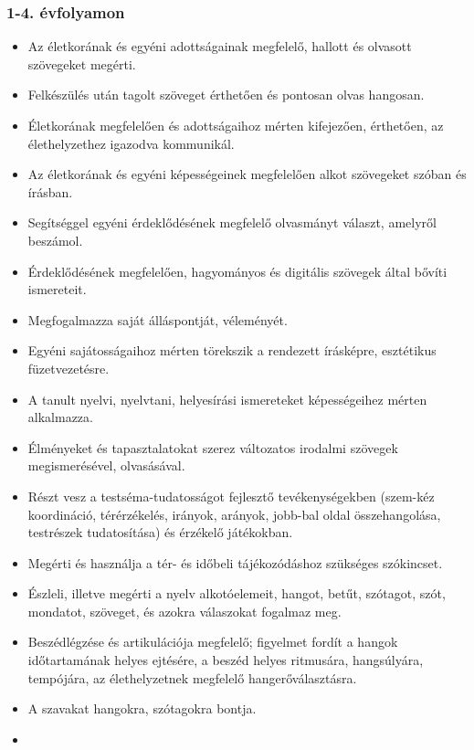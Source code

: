 \hypertarget{evfolyamon-21}{%
\subsubsection{1-4. évfolyamon}\label{evfolyamon-21}}

\begin{itemize}
\item
  Az életkorának és egyéni adottságainak megfelelő, hallott és olvasott
  szövegeket megérti.
\item
  Felkészülés után tagolt szöveget érthetően és pontosan olvas hangosan.
\item
  Életkorának megfelelően és adottságaihoz mérten kifejezően, érthetően,
  az élethelyzethez igazodva kommunikál.
\item
  Az életkorának és egyéni képességeinek megfelelően alkot szövegeket
  szóban és írásban.
\item
  Segítséggel egyéni érdeklődésének megfelelő olvasmányt választ,
  amelyről beszámol.
\item
  Érdeklődésének megfelelően, hagyományos és digitális szövegek által
  bővíti ismereteit.
\item
  Megfogalmazza saját álláspontját, véleményét.
\item
  Egyéni sajátosságaihoz mérten törekszik a rendezett írásképre,
  esztétikus füzetvezetésre.
\item
  A tanult nyelvi, nyelvtani, helyesírási ismereteket képességeihez
  mérten alkalmazza.
\item
  Élményeket és tapasztalatokat szerez változatos irodalmi szövegek
  megismerésével, olvasásával.
\item
  Részt vesz a testséma-tudatosságot fejlesztő tevékenységekben
  (szem-kéz koordináció, térérzékelés, irányok, arányok, jobb-bal oldal
  összehangolása, testrészek tudatosítása) és érzékelő játékokban.
\item
  Megérti és használja a tér- és időbeli tájékozódáshoz szükséges
  szókincset.
\item
  Észleli, illetve megérti a nyelv alkotóelemeit, hangot, betűt,
  szótagot, szót, mondatot, szöveget, és azokra válaszokat fogalmaz meg.
\item
  Beszédlégzése és artikulációja megfelelő; figyelmet fordít a hangok
  időtartamának helyes ejtésére, a beszéd helyes ritmusára, hangsúlyára,
  tempójára, az élethelyzetnek megfelelő hangerőválasztásra.
\item
  A szavakat hangokra, szótagokra bontja.
\item

\end{itemize}
